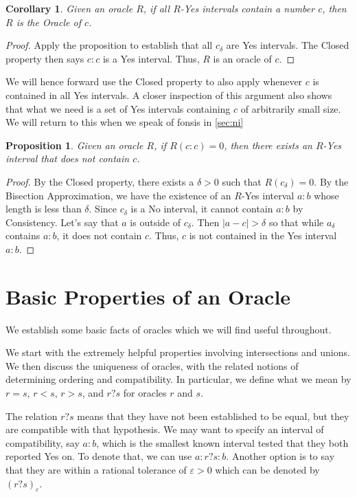 \documentclass[12pt]{article}
\newtheorem{corollary}{Corollary}[subsection]
\newtheorem{proposition}{Proposition}[subsection]
\begin{document}
\begin{corollary}
        Given an oracle $R$, if all $R$-Yes intervals contain a number $c$, then $R$ is the Oracle of $c$.
\end{corollary}

\begin{proof}
    Apply the proposition to establish that all $c_\delta$ are Yes intervals. The Closed property then says $c:c$ is a Yes interval. Thus, $R$ is an oracle of $c$.
\end{proof}

We will hence forward use the Closed property to also apply whenever $c$ is contained in all Yes intervals. A closer inspection of this argument also shows that what we need is a set of Yes intervals containing $c$ of arbitrarily small size. We will return to this when we speak of fonsis in \ref{sec:ni}

\begin{proposition}
    Given an oracle $R$, if $R(c:c)=0$, then there exists an $R$-Yes interval that does not contain $c$.
\end{proposition}

\begin{proof}
    By the Closed property, there exists a $\delta > 0$ such that $R(c_\delta)=0$. By the Bisection Approximation, we have the existence of an $R$-Yes interval $a:b$ whose length is less than $\delta$. Since $c_\delta$ is a No interval, it cannot contain $a:b$ by Consistency. Let's say that $a$ is outside of $c_\delta$. Then $|a-c| > \delta$ so that while $a_\delta$ contains $a:b$, it does not contain $c$. Thus, $c$ is not contained in the Yes interval $a:b$.
\end{proof}


\section{Basic Properties of an Oracle}

We establish some basic facts of oracles which we will find useful throughout. 

We start with the extremely helpful properties involving intersections and unions. We then discuss the uniqueness of oracles, with the related notions of determining ordering and compatibility. In particular, we define what we mean by $r = s$, $r<s$, $r>s$, and $r ? s$ for oracles $r$ and $s$. 

The relation $r ? s$ means that they have not been established to be equal, but they are compatible with that hypothesis. We may want to specify an interval of compatibility, say $a:b$, which is the smallest known interval tested that they both reported Yes on. To denote that, we can use $a:r?s:b$. Another option is to say that they are within a rational tolerance of $\varepsilon > 0$ which can be denoted by $(r?s)_{\varepsilon}$.
\end{document}
